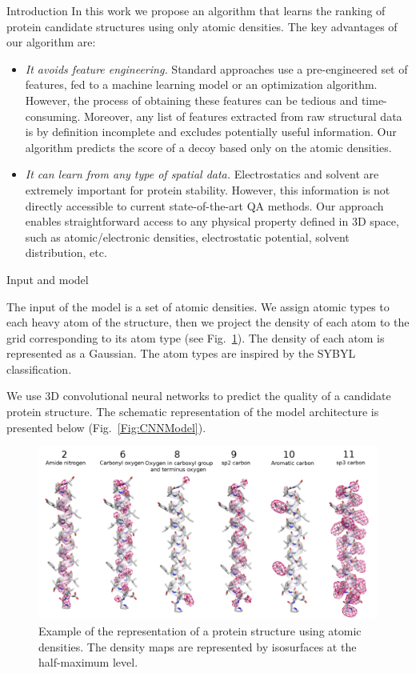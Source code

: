\documentclass[final, unknownkeysallowed]{beamer}
\begin{document}
\begin{frame}{}
\begin{textblock}{39.0}
\begin{block}{Introduction}
\vspace{0.5cm}
In this work we propose an algorithm that learns the ranking of
protein candidate structures using only atomic densities. The key
advantages of our algorithm are:
\begin{itemize}
\item \emph{It avoids feature engineering.} Standard approaches use a
  pre-engineered set of features, fed to a machine learning model or
  an optimization algorithm.  However, the process of obtaining these
  features can be tedious and time-consuming.  Moreover, any list of
  features extracted from raw structural data is by definition
  incomplete and excludes potentially useful information. Our
  algorithm predicts the score of a decoy based only on the atomic
  densities.
\item \emph{It can learn from any type of spatial data.}
  Electrostatics and solvent are extremely important for protein
  stability.  However, this information is not directly accessible to
  current state-of-the-art QA methods.  Our approach enables
  straightforward access to any physical property defined in 3D space,
  such as atomic/electronic densities, electrostatic potential,
  solvent distribution, etc.
\end{itemize}
\end{block}

\begin{block}{Input and model}

The input of the model is a set of atomic densities. We assign atomic
types to each heavy atom of the structure, then we project the density
of each atom to the grid corresponding to its atom type (see
Fig.~\ref{Fig:atomic_densities}).  The density of each atom is
represented as a Gaussian.  The atom types are inspired by the SYBYL
classification.

\vspace{0.5cm}
We use 3D convolutional neural networks to predict the quality of a
candidate protein structure.  The schematic representation of the
model architecture is presented below (Fig.~\ref{Fig:CNNModel}).

\begin{figure}[H]
    \centering
    \includegraphics[width=0.6\linewidth]{../draft/Fig/atomic_densities_V3.png}
    \captionsetup{width=0.8\linewidth}
    \caption{Example of the representation of a protein structure
      using atomic densities. The density maps are represented by
      isosurfaces at the half-maximum level.}
    \label{Fig:atomic_densities}
\end{figure}


\end{block}
\end{textblock}
\end{frame}
\end{document}
